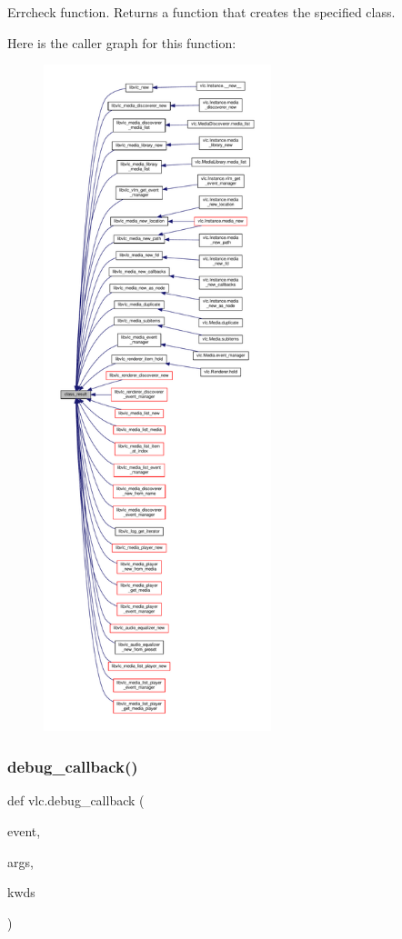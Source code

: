 \begin{DoxyVerb}Errcheck function. Returns a function that creates the specified class.
\end{DoxyVerb}
 Here is the caller graph for this function\+:
\nopagebreak
\begin{figure}[H]
\begin{center}
\leavevmode
\includegraphics[height=550pt]{namespacevlc_abd89c56c1c1f69dc7c4c602ed938d5b4_icgraph}
\end{center}
\end{figure}
\mbox{\label{namespacevlc_a14ed115618edb9fde8ca534d70c5e283}} 
\subsubsection{\texorpdfstring{debug\+\_\+callback()}{debug\_callback()}}
{\footnotesize\ttfamily def vlc.\+debug\+\_\+callback (\begin{DoxyParamCaption}\item[{}]{event,  }\item[{}]{args,  }\item[{}]{kwds }\end{DoxyParamCaption})}

